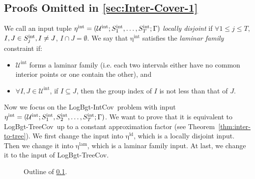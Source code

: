 \documentclass[11pt,a4paper]{article} \usepackage{enumitem}
\newcommand{\calU}{\mathcal{U}}
\newcommand{\LBOintcov}{\textsf{LogBgt-IntCov}}
\newcommand{\LBOtreecov}{\textsf{LogBgt-TreeCov}}
\newcommand{\intU}{\operatorname{\calU^{int}}}
\newcommand{\intS}[1]{\ifx\relax#1\relax
    S^{\operatorname{int}} \else
    S^{\operatorname{int}}_{#1} \fi
}
\newcommand{\inteta}{\operatorname{\eta^{int}}}
\newcommand{\ldeta}{\operatorname{\eta^{ld}}}
\newcommand{\lameta}{\operatorname{\eta^{lam}}}
\theoremstyle{definition}
\begin{document}
\subsection{Proofs Omitted in \cref{sec:Inter-Cover-1}}
\label{sec:proofof6.1}
We call an input tuple $\inteta = (\intU; \intS{1}, \dots, \intS{T}; \Gamma)$ \emph{locally disjoint} if $\forall 1 \leq j \leq T$, $I, J \in \intS{j},I\neq J$, $I \cap J = \emptyset$. We say that $\inteta$ satisfies the \emph{laminar family} constraint if: 
\begin{itemize}
    \item $\intU$ forms a laminar family (i.e. each two intervals either have no common interior points or one contain the other), and \item $\forall I, J \in \intU$, if $I \subseteq J$, then the group index of $I$ is not less than that of $J$.
\end{itemize}
Now we focus on the \LBOintcov\ problem with input $\inteta = (\intU; \intS{1}, \intS{2}, \dots, \intS{T}; \Gamma)$. 
We want to prove that it is equivalent to \LBOtreecov\ 
up to a constant approximation factor 
(see Theorem~\ref{thm:inter-to-tree}).
We first change the input into $\ldeta$, which is a locally disjoint input.
Then we change it into $\lameta$, which is a laminar family input.
At last, we change it to the input of \LBOtreecov.

\begin{figure}[t]
\begin{minipage}{\textwidth}
    \centering
{}
\caption{Outline of \cref{sec:proofof6.1}.}
\end{minipage}
\end{figure} 
\end{document}
